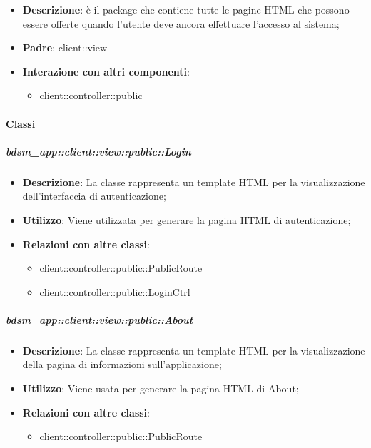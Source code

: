 \begin{itemize}
	\item \textbf{Descrizione}: è il package che contiene tutte le pagine HTML che possono essere offerte quando l'utente deve ancora effettuare l'accesso al sistema;
	\item \textbf{Padre}: client::view
	\item \textbf{Interazione con altri componenti}: 
		\begin{itemize}
			\item client::controller::public
		\end{itemize}
\end{itemize}

	\paragraph{Classi} %
		\subparagraph{bdsm\_app::client::view::public::Login} %
		\label{subp:bdsm_app_client_view_public_login}
			\begin{itemize}
				\item \textbf{Descrizione}: La classe rappresenta un template HTML per la visualizzazione dell'interfaccia di autenticazione;
				\item \textbf{Utilizzo}: Viene utilizzata per generare la pagina HTML di autenticazione;
				\item \textbf{Relazioni con altre classi}:
					\begin{itemize}
						\item client::controller::public::PublicRoute
						\item client::controller::public::LoginCtrl
					\end{itemize}
			\end{itemize}

		\subparagraph{bdsm\_app::client::view::public::About} %
		\label{subp:bdsm_app_client_view_public_about}
			\begin{itemize}
				\item \textbf{Descrizione}: La classe rappresenta un template HTML per la visualizzazione della pagina di informazioni sull'applicazione;
				\item \textbf{Utilizzo}: Viene usata per generare la pagina HTML di About;
				\item \textbf{Relazioni con altre classi}:
					\begin{itemize}
						\item client::controller::public::PublicRoute
					\end{itemize}
			\end{itemize}

